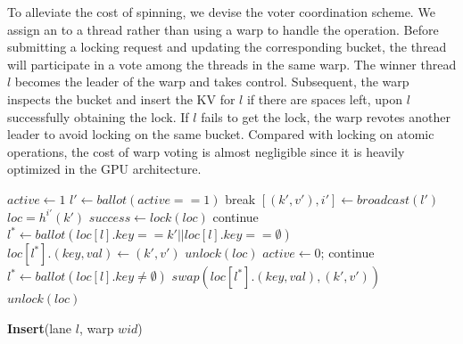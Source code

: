 To alleviate the cost of spinning, we devise the voter coordination scheme. 
We assign an  to a thread rather than using a warp to handle the operation. Before submitting a locking request and updating the corresponding bucket, the thread will participate in a vote among the threads in the same warp. 
The winner thread $l$ becomes the leader of the warp and takes control. Subsequent, the warp inspects the bucket and insert the KV for $l$ if there are spaces left, upon $l$ successfully obtaining the lock.
If $l$ fails to get the lock, the warp revotes another leader to avoid locking on the same bucket.
Compared with locking on atomic operations, the cost of warp voting is almost negligible since it is heavily optimized in the GPU architecture.  


\begin{algorithm}[t]
	\begin{algorithmic}[1]
		\State $active \gets 1$	\label{algo:insert:active:start}
		\State $l' \gets ballot(active == 1)$ \label{algo:insert:vote:start}
		\State break \label{algo:insert:active:end}
		\EndIf
		\State $[(k',v'),i'] \gets broadcast(l')$ \label{algo:insert:lock:start}
		\State $loc = h^{i'}(k')$
		\State $success \gets lock(loc)$ \label{algo:insert:lock:end}
		\EndIf
		\State continue					\label{algo:insert:vote:end}
		\EndIf
		\State $l^* \gets ballot(loc[l].key == k' || loc[l].key ==\emptyset)$ \label{algo:insert:write:start}
		\State $loc[l^*].(key,val) \gets (k',v')$
		\State $unlock(loc)$
		\State $active \gets 0$;
		\State continue			\label{algo:insert:write:end}
		\EndIf
		\State $l^* \gets ballot(loc[l].key \neq \emptyset)$
		\State $swap(loc[l^*].(key,val),(k',v'))$
		\State $unlock(loc)$ \label{algo:insert:loop:end}
		\EndIf
		\EndWhile
	\end{algorithmic}
	\caption{\textbf{Insert}(lane $l$, warp $wid$)}\label{algo:insert}
\end{algorithm}

